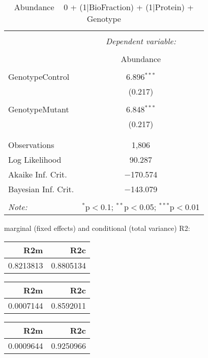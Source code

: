 \documentclass[11pt]{report}
\begin{document}
\begin{table}[!htbp] \centering 
  \caption{Abundance ~ 0 + (1|BioFraction) + (1|Protein) + Genotype} 
  \label{} 
\begin{tabular}{@{\extracolsep{5pt}}lc} 
\\[-1.8ex]\hline 
\hline \\[-1.8ex] 
 & \multicolumn{1}{c}{\textit{Dependent variable:}} \\ 
\cline{2-2} 
\\[-1.8ex] & Abundance \\ 
\hline \\[-1.8ex] 
 GenotypeControl & 6.896$^{***}$ \\ 
  & (0.217) \\ 
  & \\ 
 GenotypeMutant & 6.848$^{***}$ \\ 
  & (0.217) \\ 
  & \\ 
\hline \\[-1.8ex] 
Observations & 1,806 \\ 
Log Likelihood & 90.287 \\ 
Akaike Inf. Crit. & $-$170.574 \\ 
Bayesian Inf. Crit. & $-$143.079 \\ 
\hline 
\hline \\[-1.8ex] 
\textit{Note:}  & \multicolumn{1}{r}{$^{*}$p$<$0.1; $^{**}$p$<$0.05; $^{***}$p$<$0.01} \\ 
\end{tabular} 
\end{table} 
marginal (fixed effects) and conditional (total variance) R2:

\begin{tabular}{r|r}
\hline
R2m & R2c\\
\hline
0.8213813 & 0.8805134\\
\hline
\end{tabular}

\begin{tabular}{r|r}
\hline
R2m & R2c\\
\hline
0.0007144 & 0.8592011\\
\hline
\end{tabular}

\begin{tabular}{r|r}
\hline
R2m & R2c\\
\hline
0.0009644 & 0.9250966\\
\hline
\end{tabular}
\end{document}
